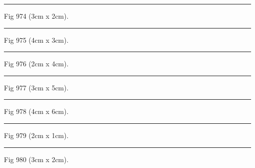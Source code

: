 \documentclass[a4paper,11pt]{article}
\begin{document}
\begin{swarmwrap}%
  \begin{minipage}[t]{3cm}
    \centering
    \rule{\linewidth}{2cm}
    {\footnotesize Fig 974 (3cm x 2cm).}
  \end{minipage}%
\end{swarmwrap}%
\swarmwrapnext
\lipsum[74]%

\begin{swarmwrap}%
  \begin{minipage}[t]{4cm}
    \centering
    \rule{\linewidth}{3cm}
    {\footnotesize Fig 975 (4cm x 3cm).}
  \end{minipage}%
\end{swarmwrap}%
\swarmwrapnext
\lipsum[75]%

\begin{swarmwrap}%
  \begin{minipage}[t]{2cm}
    \centering
    \rule{\linewidth}{4cm}
    {\footnotesize Fig 976 (2cm x 4cm).}
  \end{minipage}%
\end{swarmwrap}%
\swarmwrapnext
\lipsum[76]%

\begin{swarmwrap}%
  \begin{minipage}[t]{3cm}
    \centering
    \rule{\linewidth}{5cm}
    {\footnotesize Fig 977 (3cm x 5cm).}
  \end{minipage}%
\end{swarmwrap}%
\swarmwrapnext
\lipsum[77]%

\begin{swarmwrap}%
  \begin{minipage}[t]{4cm}
    \centering
    \rule{\linewidth}{6cm}
    {\footnotesize Fig 978 (4cm x 6cm).}
  \end{minipage}%
\end{swarmwrap}%
\swarmwrapnext
\lipsum[78]%

\begin{swarmwrap}%
  \begin{minipage}[t]{2cm}
    \centering
    \rule{\linewidth}{1cm}
    {\footnotesize Fig 979 (2cm x 1cm).}
  \end{minipage}%
\end{swarmwrap}%
\swarmwrapnext
\lipsum[79]%

\begin{swarmwrap}%
  \begin{minipage}[t]{3cm}
    \centering
    \rule{\linewidth}{2cm}
    {\footnotesize Fig 980 (3cm x 2cm).}
  \end{minipage}%
\end{swarmwrap}%
\swarmwrapnext
\lipsum[80]%
\end{document}
